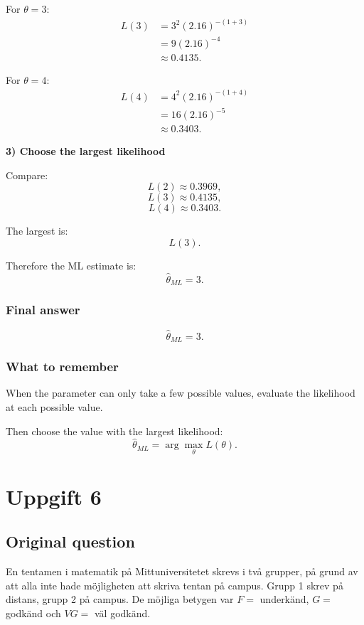 \documentclass[10pt]{article}
\begin{document}
For \(\theta=3\):
\begin{align*}
L(3)
&=
3^2(2.16)^{-(1+3)}
\\[2mm]
&=
9(2.16)^{-4}
\\[2mm]
&\approx 0.4135.
\end{align*}

For \(\theta=4\):
\begin{align*}
L(4)
&=
4^2(2.16)^{-(1+4)}
\\[2mm]
&=
16(2.16)^{-5}
\\[2mm]
&\approx 0.3403.
\end{align*}

\textbf{3) Choose the largest likelihood}

Compare:
\[
L(2)\approx 0.3969,
\]
\[
L(3)\approx 0.4135,
\]
\[
L(4)\approx 0.3403.
\]

The largest is:
\[
L(3).
\]

Therefore the ML estimate is:
\[
\hat{\theta}_{ML}=3.
\]

\subsubsection*{Final answer}

\[
\hat{\theta}_{ML}=3.
\]

\subsubsection*{What to remember}

When the parameter can only take a few possible
values, evaluate the likelihood at each possible
value.

Then choose the value with the largest likelihood:
\[
\hat{\theta}_{ML}
=
\arg\max_{\theta} L(\theta).
\]

\section*{Uppgift 6}

\subsection*{Original question}

En tentamen i matematik på Mittuniversitetet skrevs
i två grupper, på grund av att alla inte hade
möjligheten att skriva tentan på campus. Grupp 1
skrev på distans, grupp 2 på campus. De möjliga
betygen var \(F=\) underkänd, \(G=\) godkänd och
\(VG=\) väl godkänd.
\end{document}

